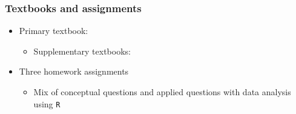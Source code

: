 \documentclass[table, xcolor = {dvipsnames}, 9pt]{beamer}
\theoremstyle{plain}
\begin{document}
\begin{frame}[t]
\frametitle{Textbooks and assignments}
\vfill
\begin{itemize} \vfill
\item Primary textbook: \citet{rosenbaum2017} \vfill
\begin{itemize}
\item Supplementary textbooks: \citet{rosenbaum2002,rosenbaum2010,imbensrubin2015,gerbergreen2012} \vfill
\end{itemize}    
\item Three homework assignments \vfill
\begin{itemize} \vfill
\item Mix of conceptual questions and applied questions with data analysis using \texttt{R} \vfill
\end{itemize} \vfill
\end{itemize} \vfill
\vfill
\begin{block}{}
{\scriptsize

}
  \end{block}
\end{frame}
\end{document}
